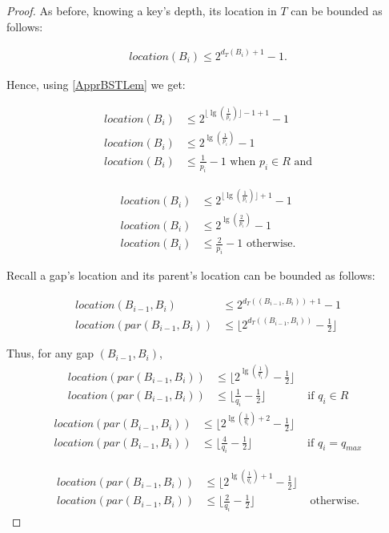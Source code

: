 \documentclass[letterpaper,12pt,titlepage,oneside,final]{book}
\theoremstyle{plain}
\begin{document}
\begin{proof}
As before, knowing a key's depth, its location in $T$ can be bounded as follows:

\begin{align*}
location(B_i) \leq 2^{d_T(B_i)+1}-1.
\end{align*}

Hence, using \ref{ApprBSTLem} we get:

\begin{align*}
location(B_i) &\leq 2^{\lfloor \lg(\frac{1}{p_i}) \rfloor -1 +1}-1 \\
location(B_i) &\leq 2^{\lg(\frac{1}{p_i})}-1 \\
location(B_i) &\leq \frac{1}{p_i}-1 \text{ when } p_i \in R  \text{ and}
\end{align*}

\begin{align*}
location(B_i) &\leq 2^{\lfloor \lg(\frac{1}{p_i}) \rfloor +1}-1 \\
location(B_i) &\leq 2^{\lg(\frac{2}{p_i})}-1 \\
location(B_i) &\leq \frac{2}{p_i}-1 \text{ otherwise.}
\end{align*}


Recall a gap's location and its parent's location can be bounded as follows:

\begin{align*}
location(B_{i-1}, B_i) &\leq 2^{d_T((B_{i-1},B_i))+1}-1 \\
location(par(B_{i-1}, B_i)) &\leq \lfloor 2^{d_T((B_{i-1},B_i))}-\frac{1}{2} \rfloor
\end{align*}

Thus, for any gap $(B_{i-1},B_i)$,
\begin{align*}
location(par(B_{i-1},B_i)) &\leq \lfloor 2^{\lg(\frac{1}{q_i})}-\frac{1}{2} \rfloor& \\
location(par(B_{i-1},B_i)) &\leq \lfloor \frac{1}{q_i}-\frac{1}{2} \rfloor &\text{ if } q_i \in R 
\end{align*}
\begin{align*}
location(par(B_{i-1},B_i)) &\leq \lfloor 2^{\lg(\frac{1}{q_i}) + 2}-\frac{1}{2} \rfloor& \\
location(par(B_{i-1},B_i)) &\leq \lfloor \frac{4}{q_i}-\frac{1}{2} \rfloor &\text{ if } q_i = q_{max}
\end{align*}

\begin{align*}
location(par(B_{i-1},B_i)) &\leq \lfloor 2^{\lg(\frac{1}{q_i}) + 1}-\frac{1}{2} \rfloor& \\
location(par(B_{i-1},B_i)) &\leq \lfloor \frac{2}{q_i}-\frac{1}{2} \rfloor &\text{ otherwise.}
\end{align*}

\end{proof}
\end{document}
